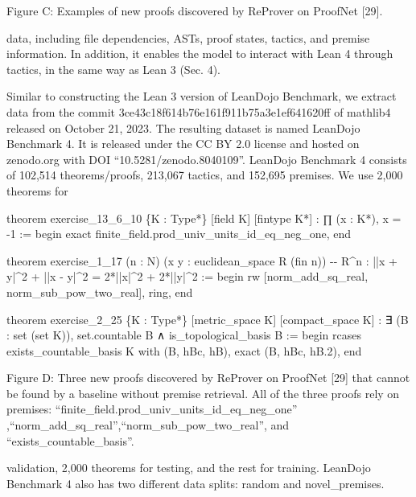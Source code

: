 \documentclass[
]{article}
\newenvironment{Shaded}{}{}
\newcommand{\NormalTok}[1]{#1}
\begin{document}
Figure C: Examples of new proofs discovered by ReProver on ProofNet
{[}29{]}.

data, including file dependencies, ASTs, proof states, tactics, and
premise information. In addition, it enables the model to interact with
Lean 4 through tactics, in the same way as Lean 3 (Sec. 4).

Similar to constructing the Lean 3 version of LeanDojo Benchmark, we
extract data from the commit 3ce43c18f614b76e161f911b75a3e1ef641620ff of
mathlib4 released on October 21, 2023. The resulting dataset is named
LeanDojo Benchmark 4. It is released under the CC BY 2.0 license and
hosted on zenodo.org with DOI ``10.5281/zenodo.8040109''. LeanDojo
Benchmark 4 consists of 102,514 theorems/proofs, 213,067 tactics, and
152,695 premises. We use 2,000 theorems for

\begin{Shaded}
\begin{Highlighting}[]
\NormalTok{theorem exercise\_13\_6\_10 \{K : Type*\} [field K] [fintype K*] :}
\NormalTok{    ∏ (x : K*), x = {-}1 :=}
\NormalTok{begin}
\NormalTok{    exact finite\_field.prod\_univ\_units\_id\_eq\_neg\_one,}
\NormalTok{end}

\NormalTok{theorem exercise\_1\_17}
\NormalTok{    (n : N)}
\NormalTok{    (x y : euclidean\_space R (fin n)) {-}{-} R\^{}n}
\NormalTok{    : ||x + y|\^{}2 + ||x {-} y|\^{}2 = 2*||x|\^{}2 + 2*||y|\^{}2 :=}
\NormalTok{begin}
\NormalTok{    rw [norm\_add\_sq\_real, norm\_sub\_pow\_two\_real],}
\NormalTok{    ring,}
\NormalTok{end}

\NormalTok{theorem exercise\_2\_25 \{K : Type*\} [metric\_space K] [compact\_space K] :}
\NormalTok{    ∃ (B : set (set K)), set.countable B ∧ is\_topological\_basis B :=}
\NormalTok{begin}
\NormalTok{    rcases exists\_countable\_basis K with (B, hBc, hB),}
\NormalTok{    exact (B, hBc, hB.2),}
\NormalTok{end }
\end{Highlighting}
\end{Shaded}

Figure D: Three new proofs discovered by ReProver on ProofNet {[}29{]}
that cannot be found by a baseline without premise retrieval. All of the
three proofs rely on premises:
``finite\_field.prod\_univ\_units\_id\_eq\_neg\_one''\\
,``norm\_add\_sq\_real'',``norm\_sub\_pow\_two\_real'', and
``exists\_countable\_basis''.

validation, 2,000 theorems for testing, and the rest for training.
LeanDojo Benchmark 4 also has two different data splits: random and
novel\_premises.
\end{document}
